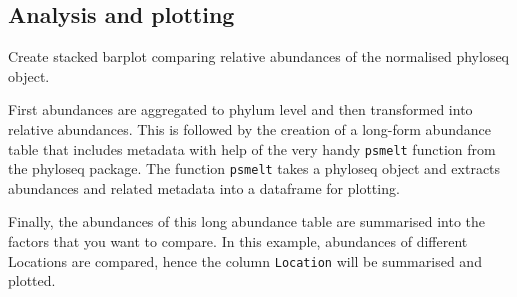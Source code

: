 \documentclass[
]{book}
\begin{document}
\hypertarget{analysis-and-plotting}{%
\subsection{Analysis and plotting}\label{analysis-and-plotting}}

Create stacked barplot comparing relative abundances of the normalised phyloseq object.

First abundances are aggregated to phylum level and then transformed into relative abundances. This is followed by the creation of a long-form abundance table that includes metadata with help of the very handy \texttt{psmelt} function from the phyloseq package. The function \texttt{psmelt} takes a phyloseq object and extracts abundances and related metadata into a dataframe for plotting.

Finally, the abundances of this long abundance table are summarised into the factors that you want to compare. In this example, abundances of different Locations are compared, hence the column \texttt{Location} will be summarised and plotted.
\end{document}
